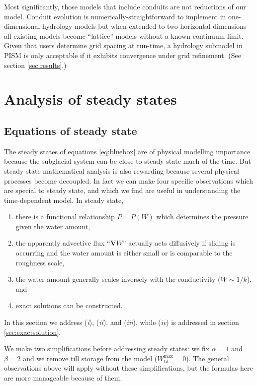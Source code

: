 \documentclass[gmd]{copernicus}   %
\newcommand{\text}{\textrm}
\newcommand\bV{\mathbf{V}}
\newcommand{\Wtilmax}{W_{\text{til}}^{\text{max}}}
\begin{document}
Most significantly, those models that include conduits \citep[among others]{Hewittetal2012,PimentelFlowers2011,Schoofmeltsupply} are not reductions of our model.  Conduit evolution is numerically-straightforward to implement in one-dimensional hydrology models \citep{Hewittetal2012,PimentelFlowers2011,vanderWeletal2013} but when extended to two-horizontal dimensions all existing models \citep{Hewitt2013,Schoofmeltsupply} become ``lattice'' models without a known continuum limit.  Given that users determine grid spacing at run-time, a hydrology submodel in PISM is only acceptable if it exhibits convergence under grid refinement.  (See section \ref{sec:results}.)


\section{Analysis of steady states}  \label{sec:steady}

\subsection{Equations of steady state}  The steady states of equations \eqref{eq:bluebox} are of physical modelling importance because the subglacial system can be close to steady state much of the time.  But steady state mathematical analysis is also rewarding because several physical processes become decoupled.  In fact we can make four specific observations which are special to steady state, and which we find are useful in understanding the time-dependent model.  In steady state,
\renewcommand{\labelenumi}{(\emph{\roman{enumi}})}
\begin{enumerate}
\item there is a functional relationship $P=P(W)$ which determines the pressure given the water amount,
\item the apparently advective flux ``$\bV W$'' actually acts diffusively if sliding is occurring and the water amount is either small or is comparable to the roughness scale,
\item the water amount generally scales inversely with the conductivity ($W \sim 1/k$), and
\item exact solutions can be constructed.
\end{enumerate}
In this section we address (\emph{i}), (\emph{ii}), and (\emph{iii}), while (\emph{iv}) is addressed in section \ref{sec:exactsolution}.

We make two simplifications before addressing steady states: we fix $\alpha=1$ and $\beta=2$ and we remove till storage from the model ($\Wtilmax=0$).  The general observations above will apply without these simplifications, but the formulas here are more manageable because of them.
\end{document}
